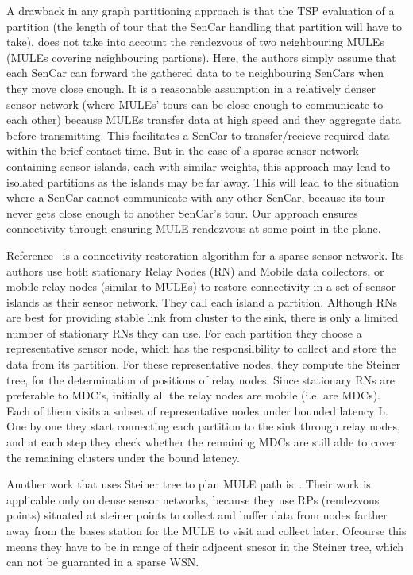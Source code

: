 A drawback in any graph partitioning approach is that the TSP evaluation of a partition (the length of tour that the SenCar handling that partition will have to take), does not take into account the rendezvous of two neighbouring MULEs (MULEs covering neighbouring partions). Here, the authors simply assume that each SenCar can forward the gathered data to te neighbouring SenCars when they move close enough. It is a reasonable assumption in a relatively denser sensor network (where MULEs' tours can be close enough to communicate to each other) because MULEs transfer data at high speed and they aggregate data before transmitting. This facilitates a SenCar to transfer/recieve required data within the brief contact time. But in the case of a sparse sensor network containing sensor islands, each with similar weights, this approach may lead to isolated partitions as the islands may be far away. This will lead to the situation where a SenCar cannot communicate with any other SenCar, because its tour never gets close enough to another SenCar's tour. Our approach ensures connectivity through ensuring MULE rendezvous at some point in the plane.

Reference~\cite{sim3} is a connectivity restoration algorithm for a sparse sensor network. Its authors use both stationary Relay Nodes (RN) and Mobile data collectors, or mobile relay nodes (similar to MULEs) to restore connectivity in a set of sensor islands as their sensor network. They call each island a partition. Although RNs are best for providing stable link from cluster to the sink, there is only a limited number of stationary RNs they can use. For each partition they choose a representative sensor node, which has the responsilbility to collect and store the data from its partition. For these representative nodes, they compute the Steiner tree, for the determination of positions of relay nodes. Since stationary RNs are preferable to MDC's, initially all the relay nodes are mobile (i.e. are MDCs). Each of them visits a subset of representative nodes under bounded latency L. One by one they start connecting each partition to the sink through relay nodes, and at each step they check whether the remaining MDCs are still able to cover the remaining clusters under the bound latency.

Another work that uses Steiner tree to plan MULE path is~\cite{rendezvous}. Their work is applicable only on dense sensor networks, because they use RPs (rendezvous points) situated at steiner points to collect and buffer data from nodes farther away from the bases station for the MULE to visit and collect later. Ofcourse this means they have to be in range of their adjacent snesor in the Steiner tree, which can not be guaranted in a sparse WSN.


